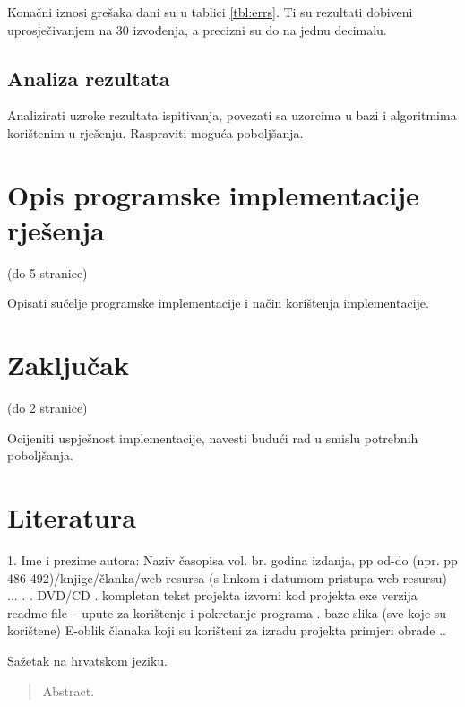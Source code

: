 \documentclass[times, utf8, diplomski]{fer}
\begin{document}
Konačni iznosi grešaka dani su u tablici \ref{tbl:errs}. Ti su rezultati dobiveni uprosječivanjem na 30 izvođenja, a precizni su do na jednu decimalu.

\section{Analiza rezultata}

Analizirati uzroke rezultata ispitivanja, povezati sa uzorcima u bazi i algoritmima korištenim u rješenju. Raspraviti moguća poboljšanja.


\chapter{Opis programske implementacije rješenja}

(do 5 stranice)

Opisati sučelje programske implementacije i način korištenja implementacije.


\chapter{Zaključak}

(do 2 stranice)

Ocijeniti uspješnost implementacije, navesti budući rad u smislu potrebnih poboljšanja. 


\chapter{Literatura}

1. Ime i prezime autora: Naziv časopisa vol. br. godina izdanja, pp od-do (npr. pp 486-492)/knjige/članka/web resursa (s linkom i datumom pristupa web resursu)
...
.
.
DVD/CD  
.
kompletan tekst projekta
izvorni kod projekta
exe verzija
readme file – upute za korištenje i pokretanje programa
.
baze slika (sve koje su korištene)
E-oblik članaka koji su korišteni za izradu projekta
primjeri obrade
..






\begin{sazetak}
Sažetak na hrvatskom jeziku.

\end{sazetak}

\begin{abstract}
Abstract.

\end{abstract}
\end{document}
